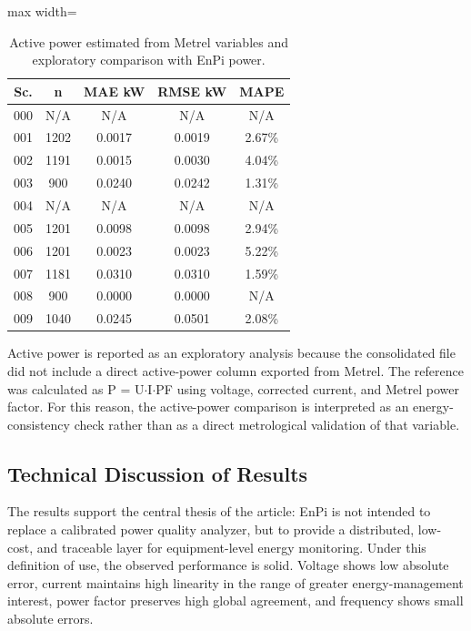 \documentclass{ieeeaccess}
\begin{document}
\begin{table}[!t]
\caption{Active power estimated from Metrel variables and exploratory comparison with EnPi power.}
\label{tab:potencia-activa-estimada-a-partir-de-variable}
\centering
\scriptsize
\begin{adjustbox}{max width=\textwidth}
\begin{tabular}{ccccc}
\toprule
Sc. & n & MAE kW & RMSE kW & MAPE \\
\midrule
000 & N/A & N/A & N/A & N/A \\
001 & 1202 & 0.0017 & 0.0019 & 2.67\% \\
002 & 1191 & 0.0015 & 0.0030 & 4.04\% \\
003 & 900 & 0.0240 & 0.0242 & 1.31\% \\
004 & N/A & N/A & N/A & N/A \\
005 & 1201 & 0.0098 & 0.0098 & 2.94\% \\
006 & 1201 & 0.0023 & 0.0023 & 5.22\% \\
007 & 1181 & 0.0310 & 0.0310 & 1.59\% \\
008 & 900 & 0.0000 & 0.0000 & N/A \\
009 & 1040 & 0.0245 & 0.0501 & 2.08\% \\
\bottomrule
\end{tabular}
\end{adjustbox}
\end{table}

Active power is reported as an exploratory analysis because the consolidated file did not include a direct active-power column exported from Metrel. The reference was calculated as P = U$\cdot$I$\cdot$PF using voltage, corrected current, and Metrel power factor. For this reason, the active-power comparison is interpreted as an energy-consistency check rather than as a direct metrological validation of that variable.

\subsection{Technical Discussion of Results}
\label{subsec:technical-discussion}

The results support the central thesis of the article: EnPi is not intended to replace a calibrated power quality analyzer, but to provide a distributed, low-cost, and traceable layer for equipment-level energy monitoring. Under this definition of use, the observed performance is solid. Voltage shows low absolute error, current maintains high linearity in the range of greater energy-management interest, power factor preserves high global agreement, and frequency shows small absolute errors.
\end{document}
